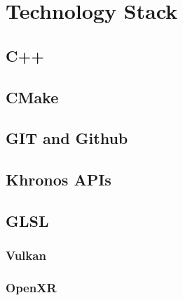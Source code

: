 \newpage
\section{Technology Stack} %
\subsection{C++}
\subsection{CMake}
\label{sec:stack_cmake}
\subsection{GIT and Github}
\subsection{Khronos APIs}
\subsection{GLSL}
\label{sec:glsl}
\subsubsection{Vulkan}
\label{sec:stack_vk}
\subsubsection{OpenXR}
\label{sec:stack_xr}